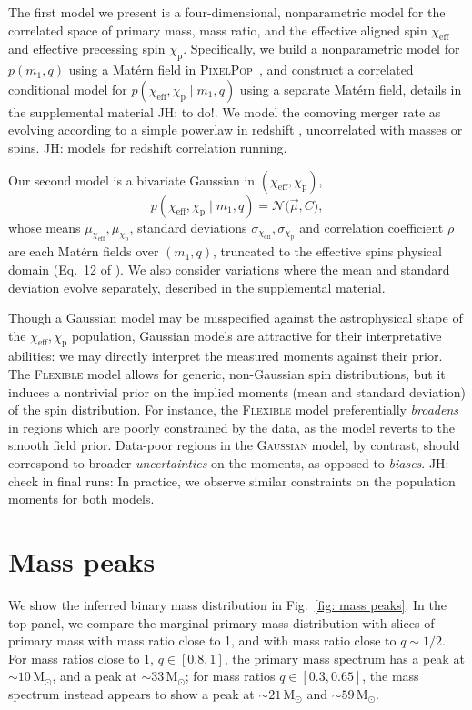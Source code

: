\documentclass[%
 reprint,
 amsmath,amssymb,
 aps,
 prl,
 nofootinbib,nobibnotes,
]{revtex4-2}
\newcommand{\Msun}{\ensuremath{\mathrm{M}_{\odot}}}
\newcommand{\chieff}{\ensuremath{\chi_{\mathrm{eff}}}}
\newcommand{\chip}{\ensuremath{\chi_{\mathrm{p}}}}
\newcommand{\jh}[1]{{\color{orange}JH: #1}}
\newcommand{\PixelPop}{\textsc{PixelPop}\xspace}
\newcommand{\flexiblespins}{\textsc{Flexible}\xspace}
\newcommand{\gaussianspins}{\textsc{Gaussian}\xspace}
\newcommand{\featTen}{10\xspace}
\newcommand{\featTwenty}{21\xspace}
\newcommand{\featThirtyFive}{33\xspace}
\newcommand{\featSixty}{59\xspace}
\begin{document}
The first model we present is a four-dimensional, nonparametric model for the correlated space of primary mass, mass ratio, and the effective aligned spin $\chieff$ and effective precessing spin $\chip$. Specifically, we build a nonparametric model for $p(m_1, q)$ using a Mat\'ern field in \PixelPop~\cite{Heinzel:2024jlc}, and construct a correlated conditional model for $p(\chieff, \chip \mid m_1, q)$ using a separate Mat\'ern field, details in the supplemental material \jh{to do!}. We model the comoving merger rate as evolving according to a simple powerlaw in redshift \cite[e.g.][]{Fishbach:2018edt}, uncorrelated with masses or spins. \jh{models for redshift correlation running.} 

Our second model is a bivariate Gaussian in $(\chieff, \chip)$,
\begin{equation}
    p(\chieff, \chip \mid m_1, q) = \mathcal{N}\big(\vec{\mu}, C\big),
\end{equation}
whose means $\mu_{\chieff}, \mu_{\chip}$, standard deviations $\sigma_{\chieff}, \sigma_{\chip}$ and correlation coefficient $\rho$ are each Mat\'ern fields over $(m_1, q)$, truncated to the effective spins physical domain (Eq.~12 of \citet{iwaya_analytic_2025}). We also consider variations where the mean and standard deviation evolve separately, described in the supplemental material.

Though a Gaussian model may be misspecified against the astrophysical shape of the $\chieff, \chip$ population, Gaussian models are attractive for their interpretative abilities: we may directly interpret the measured moments against their prior. The \flexiblespins model allows for generic, non-Gaussian spin distributions, but it induces a nontrivial prior on the implied moments (mean and standard deviation) of the spin distribution. For instance, the \flexiblespins model preferentially \textit{broadens} in regions which are poorly constrained by the data, as the model reverts to the smooth field prior. Data-poor regions in the \gaussianspins model, by contrast, should correspond to broader \textit{uncertainties} on the moments, as opposed to \textit{biases}. \jh{check in final runs:} In practice, we observe similar constraints on the population moments for both models.

\section{Mass peaks}

We show the inferred binary mass distribution in Fig.~\ref{fig: mass peaks}. In the top panel, we compare the marginal primary mass distribution with slices of primary mass with mass ratio close to 1, and with mass ratio close to $q\sim 1/2$. For mass ratios close to 1, $q\in [0.8,1]$, the primary mass spectrum has a peak at $\sim \featTen\,\Msun$, and a peak at $\sim \featThirtyFive\,\Msun$; for mass ratios $q\in [0.3,0.65]$, the mass spectrum instead appears to show a peak at $\sim \featTwenty\,\Msun$ and $\sim \featSixty\,\Msun$.
\end{document}
